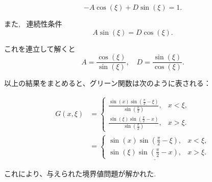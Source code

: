 \documentclass{jsarticle}
\begin{document}
\[
-A \cos(\xi) + D \sin(\xi) = 1.
\]

また, \ 連続性条件
\[
A \sin(\xi) = D \cos(\xi).
\]

これを連立して解くと
\[
A = \frac{\cos(\xi)}{\sin(\xi)}, \quad D = \frac{\sin(\xi)}{\cos(\xi)}.
\]


以上の結果をまとめると、グリーン関数は次のように表される：

\[
\begin{aligned}
G(x, \xi) &=
\begin{cases}
\frac{\sin(x) \sin\left(\frac{\pi}{2} - \xi\right)}{\sin\left(\frac{\pi}{2}\right)}, & x < \xi, \\
\frac{\sin(\xi) \sin\left(\frac{\pi}{2} - x\right)}{\sin\left(\frac{\pi}{2}\right)}, & x > \xi.
\end{cases}  \\
&= \underline{\begin{cases}
\sin(x) \sin\left(\frac{\pi}{2} - \xi\right), & x < \xi, \\
\sin(\xi) \sin\left(\frac{\pi}{2} - x\right), & x > \xi.
\end{cases}}
\end{aligned}
\]


これにより、与えられた境界値問題が解かれた.
\end{document}
